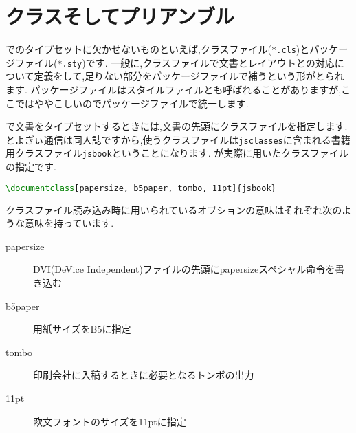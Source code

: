 \section{クラスそしてプリアンブル}

{\pLaTeX}でのタイプセットに欠かせないものといえば,クラスファイル(\texttt{*.cls})とパッケージファイル(\texttt{*.sty})です.
一般に,クラスファイルで文書とレイアウトとの対応について定義をして,足りない部分をパッケージファイルで補うという形がとられます.
パッケージファイルはスタイルファイルとも呼ばれることがありますが,ここではややこしいのでパッケージファイルで統一します.

{\pLaTeX}で文書をタイプセットするときには,文書の先頭にクラスファイルを指定します.
とよぎぃ通信は同人誌ですから,使うクラスファイルは\texttt{jsclasses}に含まれる書籍用クラスファイル\texttt{jsbook}ということになります.
が実際に用いたクラスファイルの指定です.
\begin{lstlisting}[caption=クラスファイルの指定,label=lis:class,language=tex]
\documentclass[papersize, b5paper, tombo, 11pt]{jsbook}
\end{lstlisting}
クラスファイル読み込み時に用いられているオプションの意味はそれぞれ次のような意味を持っています.
\begin{description}
	\item[papersize] DVI(DeVice Independent)ファイルの先頭にpapersizeスペシャル命令を書き込む
	\item[b5paper] 用紙サイズをB5に指定
	\item[tombo] 印刷会社に入稿するときに必要となるトンボの出力
	\item[11pt] 欧文フォントのサイズを11ptに指定
\end{description}

